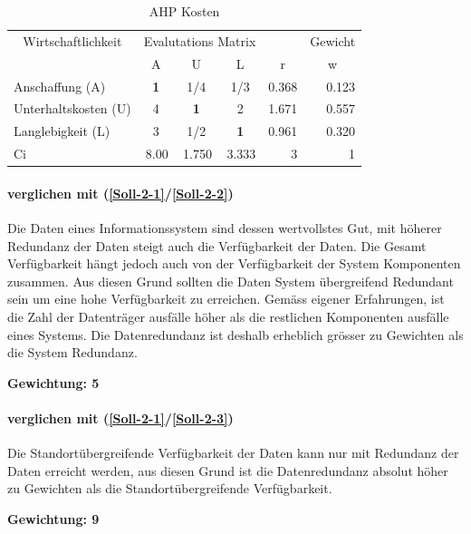 \begin{table}[htbp]
\caption{AHP Kosten}
\begin{tabular}{|l|c|c|c|r|r|}
\hline
\multicolumn{ 1}{|c|}{Wirtschaftlichkeit} & \multicolumn{ 3}{c|}{Evalutations Matrix} & \multicolumn{1}{l|}{} & \multicolumn{1}{l|}{Gewicht} \\ \cline{ 2- 6}
\multicolumn{ 1}{|c|}{} & A & U & L & \multicolumn{1}{c|}{r} & \multicolumn{1}{c|}{w} \\ \hline
Anschaffung (A) & \textbf{1} &  1/4 &  1/3 & 0.368 & 0.123 \\ \hline
Unterhaltskosten (U)  & 4 & \textbf{1} & 2 & 1.671 & 0.557 \\ \hline
Langlebigkeit (L) & 3 &  1/2 & \textbf{1} & 0.961 & 0.320 \\ \hline \hline 
Ci & \multicolumn{1}{r|}{8.00} & \multicolumn{1}{r|}{1.750} & \multicolumn{1}{r|}{3.333} & 3 & 1 \\ \hline
\end{tabular}
\label{AHPKosten}
\end{table}


\paragraph*{ verglichen mit  (\ref{Soll-2-1}/\ref{Soll-2-2})}
Die Daten eines Informationssystem sind dessen wertvollstes Gut, mit höherer Redundanz der Daten steigt auch die Verfügbarkeit der Daten.
Die Gesamt Verfügbarkeit hängt jedoch auch von der Verfügbarkeit der System Komponenten zusammen. Aus diesen Grund sollten die Daten System übergreifend Redundant sein um eine hohe Verfügbarkeit zu erreichen. Gemäss eigener Erfahrungen, ist die Zahl der Datenträger ausfälle höher als die restlichen Komponenten ausfälle eines Systems. Die Datenredundanz ist deshalb erheblich grösser zu Gewichten als die System Redundanz.

\textbf{Gewichtung: 5}

\paragraph*{ verglichen mit  (\ref{Soll-2-1}/\ref{Soll-2-3})}
Die Standortübergreifende Verfügbarkeit der Daten kann nur mit Redundanz der Daten erreicht werden, aus diesen Grund ist die Datenredundanz absolut höher zu Gewichten als die Standortübergreifende Verfügbarkeit.

\textbf{Gewichtung: 9}

